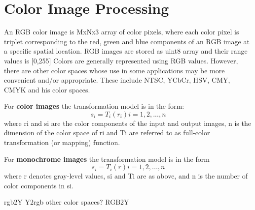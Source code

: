 \section{Color Image Processing}
An RGB color image is MxNx3 array of color pixels, where each color pixel is triplet corresponding to the red, green and blue components of an RGB image at a specific spatial location.
\newline
RGB images are stored as uint8 array and their range values is [0,255]
\newline
Colors are generally represented using RGB values. However, there are other color spaces whose use in some applications may be more convenient and/or appropriate. These include NTSC, YCbCr, HSV, CMY, CMYK and his color spaces.

For {\bf color images} the transformation model is in the form:
\begin{equation}
	s_i = T_i(r_i) i = 1,2,...,n
\end{equation}
where ri and si are the color components of the input and output images, n is the dimension of the color space of ri and Ti are referred to as full-color transformation (or mapping) function.

For {\bf monochrome images} the transformation model is in the form
\begin{equation}
	s_i = T_i(r)  i = 1,2,...,n
\end{equation}
where r denotes gray-level values, si and Ti are as above, and n is the number of color components in si.

rgb2Y
Y2rgb
other color spaces?
RGB2Y 
